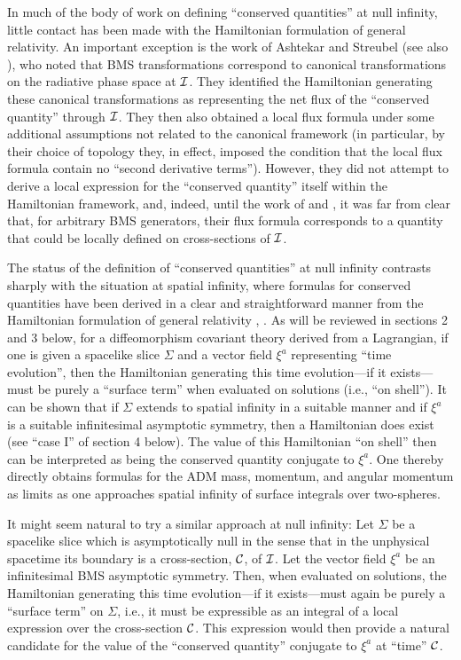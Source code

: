 In much of the body of work on defining ``conserved quantities'' at
null infinity, little contact has been made with the Hamiltonian
formulation of general relativity. An important exception is the work
of Ashtekar and Streubel \cite{as} (see also \cite{abr}), who noted
that BMS transformations correspond to canonical transformations on
the radiative phase space at ${\cal I}$. They identified the
Hamiltonian generating these canonical transformations as representing
the net flux of the ``conserved quantity'' through ${\cal I}$. They
then also obtained a local flux formula under some additional
assumptions not related to the canonical framework (in particular, by
their choice of topology they, in effect, imposed the condition that
the local flux formula contain no ``second derivative
terms''). However, they did not attempt to derive a local expression
for the ``conserved quantity'' itself within the Hamiltonian
framework, and, indeed, until the work of \cite{ds} and \cite{s}, it
was far from clear that, for arbitrary BMS generators, their flux
formula corresponds to a quantity that could be locally defined on
cross-sections of ${\cal I}$.

The status of the definition of ``conserved quantities'' at null
infinity contrasts sharply with the situation at spatial infinity,
where formulas for conserved quantities have been derived in a clear
and straightforward manner from the Hamiltonian formulation of general
relativity \cite{adm}, \cite{rt}. As will be reviewed in sections 2
and 3 below, for a diffeomorphism covariant theory derived from a
Lagrangian, if one is given a spacelike slice $\Sigma$ and a vector
field $\xi^a$ representing ``time evolution'', then the Hamiltonian
generating this time evolution---if it exists---must be purely a
``surface term'' when evaluated on solutions (i.e., ``on shell''). It
can be shown that if $\Sigma$ extends to spatial infinity in a
suitable manner and if $\xi^a$ is a suitable infinitesimal asymptotic
symmetry, then a Hamiltonian does exist (see ``case I'' of section 4
below). The value of this Hamiltonian ``on shell'' then can be
interpreted as being the conserved quantity conjugate to $\xi^a$. One
thereby directly obtains formulas for the ADM mass, momentum, and
angular momentum as limits as one approaches spatial infinity of
surface integrals over two-spheres.

It might seem natural to try a similar approach at null infinity: Let
$\Sigma$ be a spacelike slice which is asymptotically null in the
sense that in the unphysical spacetime its boundary is a
cross-section, ${\cal C}$, of ${\cal I}$. Let the vector field $\xi^a$
be an infinitesimal BMS asymptotic symmetry. Then, when evaluated on
solutions, the Hamiltonian generating this time evolution---if it
exists---must again be purely a ``surface term'' on $\Sigma$, i.e., it
must be expressible as an integral of a local expression over the
cross-section ${\cal C}$. This expression would then provide a natural
candidate for the value of the ``conserved quantity'' conjugate to
$\xi^a$ at ``time'' ${\cal C}$.

